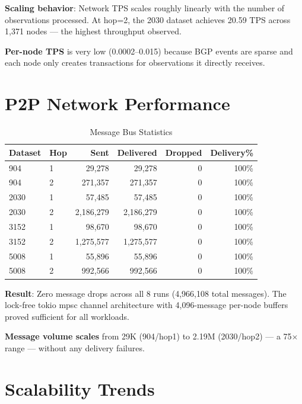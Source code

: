 \documentclass[11pt,a4paper]{article}
\begin{document}
\textbf{Scaling behavior}: Network TPS scales roughly linearly with the number of
observations processed. At hop=2, the 2030 dataset achieves 20.59 TPS across 1,371
nodes --- the highest throughput observed.

\textbf{Per-node TPS} is very low (0.0002--0.015) because BGP events are sparse and
each node only creates transactions for observations it directly receives.

\section{P2P Network Performance}

\begin{table}[H]
\centering
\caption{Message Bus Statistics}
\begin{tabular}{llrrrr}
\toprule
\textbf{Dataset} & \textbf{Hop} & \textbf{Sent} & \textbf{Delivered} & \textbf{Dropped} & \textbf{Delivery\%} \\
\midrule
904   & 1 & 29,278      & 29,278      & 0 & 100\% \\
904   & 2 & 271,357     & 271,357     & 0 & 100\% \\
2030  & 1 & 57,485      & 57,485      & 0 & 100\% \\
2030  & 2 & 2,186,279   & 2,186,279   & 0 & 100\% \\
3152  & 1 & 98,670      & 98,670      & 0 & 100\% \\
3152  & 2 & 1,275,577   & 1,275,577   & 0 & 100\% \\
5008  & 1 & 55,896      & 55,896      & 0 & 100\% \\
5008  & 2 & 992,566     & 992,566     & 0 & 100\% \\
\bottomrule
\end{tabular}
\end{table}

\textbf{Result}: Zero message drops across all 8 runs (4,966,108 total messages).
The lock-free tokio mpsc channel architecture with 4,096-message per-node buffers
proved sufficient for all workloads.

\textbf{Message volume scales} from 29K (904/hop1) to 2.19M (2030/hop2) --- a 75$\times$
range --- without any delivery failures.

\section{Scalability Trends}
\end{document}
